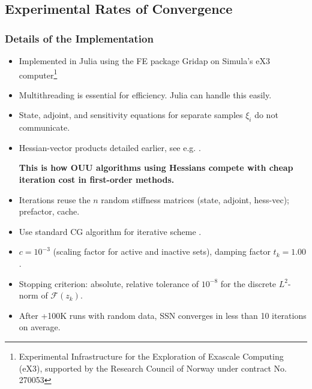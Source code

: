 \documentclass[aspectratio=169,xcolor=dvipsnames,10pt]{beamer}
\begin{document}
\subsection{Experimental Rates of Convergence}
\begin{frame}\frametitle{Details of the Implementation}
\begin{exampleblock}{}
\begin{itemize}
    \item Implemented in Julia  \cite{Julia-2017} using the FE package Gridap \cite{Badia2020} on Simula's eX3 computer\footnote{\tiny
    Experimental Infrastructure for the Exploration of Exascale Computing (eX3), supported by the Research Council of Norway under contract No. 270053}
    \item Multithreading is essential for efficiency. Julia can handle this easily.
    \item State, adjoint, and sensitivity equations for separate samples $\xi_i$ do not communicate.
    \item Hessian-vector products detailed earlier, see e.g. \cite[Chap. 1.6.5]{HPUU09}.
    \begin{center}
        \textbf{This is how OUU algorithms using Hessians compete with cheap iteration cost in first-order methods.}
    \end{center}\pause
    \item  Iterations reuse the $n$ random stiffness matrices (state, adjoint, hess-vec); prefactor, cache. 
     \item Use standard CG algorithm for iterative scheme \cite{MRHestenes_EStiefel_1952}. 
      \item $c = 10^{-3}$ (scaling factor for active and inactive sets), damping factor $t_k = 1.00$. 
      \item Stopping criterion: absolute, relative tolerance of $10^{-8}$ for the discrete $L^2$-norm of $\mathcal{F}(z_k)$.
      \item After +100K runs with random data, SSN converges in less than 10 iterations on average.
\end{itemize}    
\end{exampleblock}
\end{frame}
\end{document}
